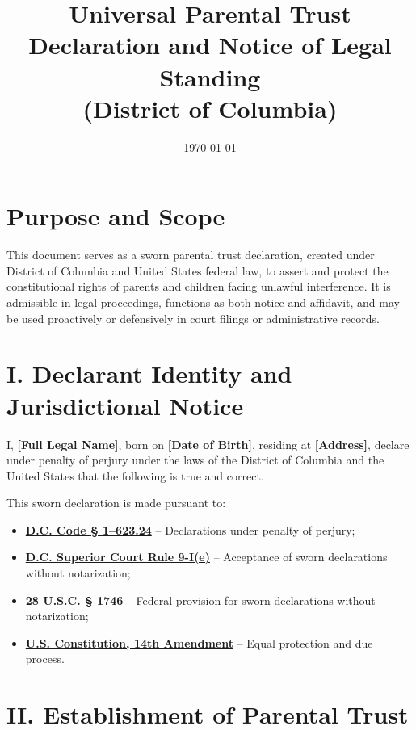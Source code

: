 \documentclass[12pt,letterpaper]{article}
\title{\textbf{Universal Parental Trust Declaration and Notice of Legal Standing \\ (District of Columbia)}}
\date{\today}
\author{}
\begin{document}
\maketitle
\onehalfspacing

\section*{Purpose and Scope}

This document serves as a sworn parental trust declaration, created under District of Columbia and United States federal law, to assert and protect the constitutional rights of parents and children facing unlawful interference. It is admissible in legal proceedings, functions as both notice and affidavit, and may be used proactively or defensively in court filings or administrative records.

\section*{I. Declarant Identity and Jurisdictional Notice}

I, \textbf{[Full Legal Name]}, born on \textbf{[Date of Birth]}, residing at \textbf{[Address]}, declare under penalty of perjury under the laws of the District of Columbia and the United States that the following is true and correct.

This sworn declaration is made pursuant to:
\begin{itemize}
  \item \href{https://code.dccouncil.gov/us/dc/council/code/sections/1-623.24}{\textbf{D.C. Code § 1–623.24}} – Declarations under penalty of perjury;
  \item \href{https://www.dccourts.gov/sites/default/files/2017-03/Superior-Court-Rules-of-Civil-Procedure.pdf}{\textbf{D.C. Superior Court Rule 9-I(e)}} – Acceptance of sworn declarations without notarization;
  \item \href{https://www.law.cornell.edu/uscode/text/28/1746}{\textbf{28 U.S.C. § 1746}} – Federal provision for sworn declarations without notarization;
  \item \href{https://www.law.cornell.edu/constitution/amendmentxiv}{\textbf{U.S. Constitution, 14th Amendment}} – Equal protection and due process.
\end{itemize}

\section*{II. Establishment of Parental Trust}
\end{document}
